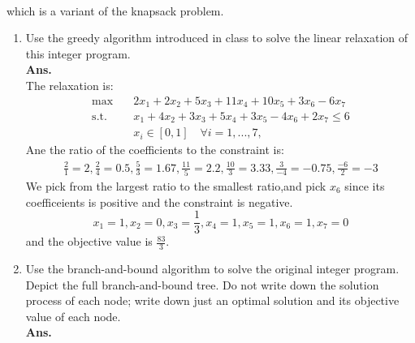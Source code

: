 \documentclass[12pt]{article}
\begin{document}
\begin{enumerate}
\begin{align*}
            \end{align*}
            which is a variant of the knapsack problem.
            \begin{enumerate}
                  \item Use the greedy algorithm introduced in class to solve the linear relaxation of this integer program.\\
                        \textbf{Ans.}\\
                        The relaxation is:
                        \begin{align*}
                              \max \quad       & 2x_1 + 2x_2 + 5x_3 + 11x_4 + 10x_5+3x_6 -6x_7       \\
                              \text{s.t.}\quad & x_1 + 4x_2 + 3x_3 + 5x_4 + 3x_5 -4x_6 + 2x_7 \leq 6 \\
                                               & x_i \in [0,1] \quad \forall i = 1,...,7,
                        \end{align*}
                        Ane the ratio of the coefficients to the constraint is:
                        \begin{equation*}
                              \begin{aligned}
                                    \frac{2}{1} = 2, \frac{2}{4} = 0.5, \frac{5}{3} = 1.67, \frac{11}{5} = 2.2, \frac{10}{3} = 3.33, \frac{3}{-4} = -0.75, \frac{-6}{2} = -3
                              \end{aligned}
                        \end{equation*}
                        We pick from the largest ratio to the smallest ratio,and pick $x_6$ since its coefficeients is positive and the constraint is negative.
                        \begin{equation*}
                              x_1 = 1,x_2 = 0,x_3 = \frac{1}{3},x_4=1,x_5 = 1,x_6 = 1, x_7 = 0
                        \end{equation*}
                        and the objective value is $\frac{83}{3}$.
                  \item Use the branch-and-bound algorithm to solve the original integer program. Depict the full branch-and-bound tree. Do not write down the solution process of each node; write down just an optimal solution and its objective value of each node.\\
                        \textbf{Ans.}\\
                        \begin{figure}

\end{figure}
\end{enumerate}
\end{enumerate}
\end{document}
